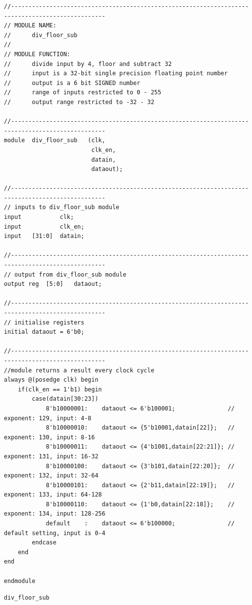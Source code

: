 \documentclass{article}
\begin{document}
\begin{listing}[H]
\begin{verbatim}
//-------------------------------------------------------------------------------------------------
// MODULE NAME: 
//      div_floor_sub
//
// MODULE FUNCTION:
//      divide input by 4, floor and subtract 32
//      input is a 32-bit single precision floating point number
//      output is a 6 bit SIGNED number
//      range of inputs restricted to 0 - 255
//      output range restricted to -32 - 32

//-------------------------------------------------------------------------------------------------
module  div_floor_sub   (clk,	
                         clk_en,
                         datain,
                         dataout);
                         
//-------------------------------------------------------------------------------------------------
// inputs to div_floor_sub module
input           clk;
input           clk_en;
input   [31:0]  datain;

//-------------------------------------------------------------------------------------------------
// output from div_floor_sub module
output reg  [5:0]   dataout;

//-------------------------------------------------------------------------------------------------
// initialise registers
initial dataout = 6'b0;

//-------------------------------------------------------------------------------------------------
//module returns a result every clock cycle
always @(posedge clk) begin
    if(clk_en == 1'b1) begin
        case(datain[30:23])
            8'b10000001:    dataout <= 6'b100001;               // exponent: 129, input: 4-8
            8'b10000010:    dataout <= {5'b10001,datain[22]};   // exponent: 130, input: 8-16
            8'b10000011:    dataout <= {4'b1001,datain[22:21]}; // exponent: 131, input: 16-32
            8'b10000100:    dataout <= {3'b101,datain[22:20]};  // exponent: 132, input: 32-64
            8'b10000101:    dataout <= {2'b11,datain[22:19]};   // exponent: 133, input: 64-128
            8'b10000110:    dataout <= {1'b0,datain[22:18]};    // exponent: 134, input: 128-256
            default    :    dataout <= 6'b100000;               // default setting, input is 0-4
        endcase
    end
end

endmodule
\end{verbatim}
\caption{{\tt div\_floor\_sub}} 
\label{lst:div_floor_sub}
\end{listing}
\end{document}
